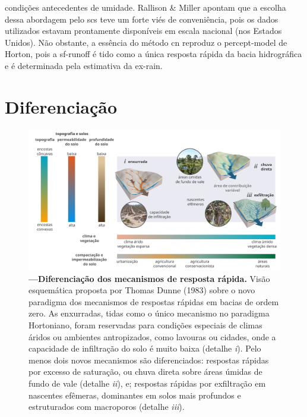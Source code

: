 \documentclass[./main.tex]{subfiles}
\begin{document}
condições antecedentes de umidade. Rallison \& Miller apontam que a escolha dessa abordagem pelo \acrshort{scs} teve um forte viés de conveniência, pois os dados utilizados estavam prontamente disponíveis em escala nacional (nos Estados Unidos). Não obstante, a essência do método \acrshort{cn} reproduz o \gls{percept-model} de Horton, pois a \gls{sf-runoff} é tido como a única resposta rápida da bacia hidrográfica e é determinada pela estimativa da \gls{ex-rain}. 

\section{Diferenciação}

\begin{figure}[t!] 
\centering				
\includegraphics[width=0.98\linewidth]{figs/fig_processes.jpg}		
\caption[Diferenciação dos mecanismos de resposta rápida.]
{\textbf{---\;Diferenciação dos mecanismos de resposta rápida.}
    Visão esquemática proposta por Thomas Dunne (1983) \cite{Dunne1983} sobre o novo paradigma dos mecanismos de respostas rápidas em bacias de ordem zero. As enxurradas, tidas como o único mecanismo no paradigma Hortoniano, foram reservadas para condições especiais de climas áridos ou ambientes antropizados, como lavouras ou cidades, onde a capacidade de infiltração do solo é muito baixa (detalhe \textrm{\textit{i}}). Pelo menos dois novos mecanismos são diferenciados: respostas rápidas por excesso de saturação, ou chuva direta sobre áreas úmidas de fundo de vale (detalhe \textrm{\textit{ii}}), e; respostas rápidas por exfiltração em nascentes efêmeras, dominantes em solos mais profundos e estruturados com macroporos (detalhe \textrm{\textit{iii}}).
}
\label{fig:hydro:diff} 		
\end{figure}
\end{document}
